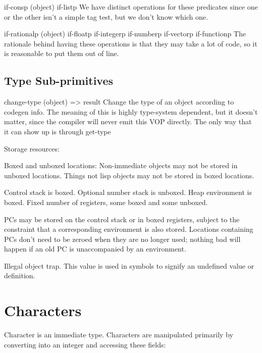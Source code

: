 if-consp (object)
if-listp
    We have distinct operations for these predicates since one or the other
    isn't a simple tag test, but we don't know which one.

if-rationalp (object)
if-floatp
if-integerp
if-numberp
if-vectorp
if-functionp
    The rationale behind having these operations is that they may take a lot of
    code, so it is reasonable to put them out of line.


\section{Type Sub-primitives}

change-type (object) => result
    Change the type of an object according to codegen info.  The meaning of
    this is highly type-system dependent, but it doesn't matter, since the
    compiler will never emit this VOP directly.  The only way that it can show
    up is through %
get-type


Storage resources:

Boxed and unboxed locations:
Non-immediate objects may not be stored in unboxed locations.
Things not lisp objects may not be stored in boxed locations.

Control stack is boxed.
Optional number stack is unboxed.
Heap environment is boxed.
Fixed number of registers, some boxed and some unboxed.

PCs may be stored on the control stack or in boxed registers, subject to the
constraint that a corresponding environment is also stored.  Locations
containing PCs don't need to be zeroed when they are no longer used; nothing
bad will happen if an old PC is unaccompanied by an environment.


\item[Trap]Illegal object trap.  This value is used in symbols to signify an
undefined value or definition.

\chapter{Characters}


Character is an immediate type.  Characters are manipulated primarily by
converting into an integer and accessing these fields:

